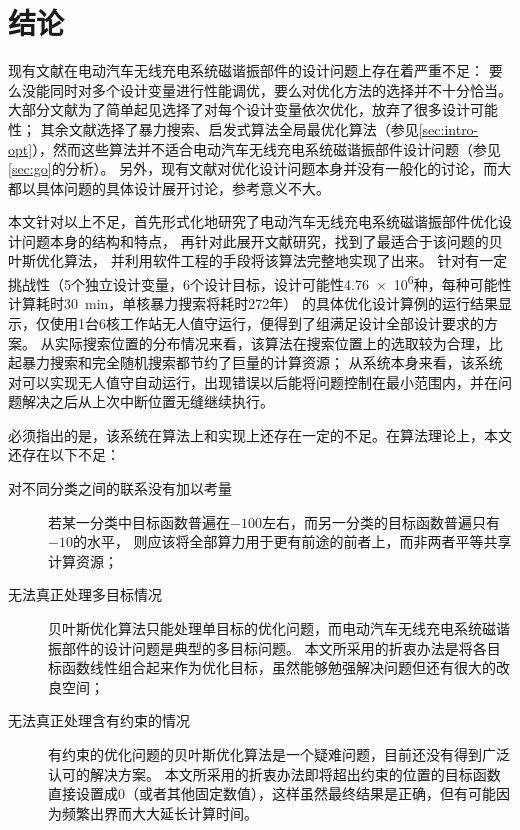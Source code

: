 \documentclass[index]{subfiles}
\begin{document}
\chapter{结论}\label{sec:con}
现有文献在电动汽车无线充电系统磁谐振部件的设计问题上存在着严重不足：
要么没能同时对多个设计变量进行性能调优，要么对优化方法的选择并不十分恰当。
大部分文献为了简单起见选择了对每个设计变量依次优化，放弃了很多设计可能性；
其余文献选择了暴力搜索、启发式算法全局最优化算法（参见\cref{sec:intro-opt}），然而这些算法并不适合电动汽车无线充电系统磁谐振部件设计问题（参见\cref{sec:go}的分析）。
另外，现有文献对优化设计问题本身并没有一般化的讨论，而大都以具体问题的具体设计展开讨论，参考意义不大。

本文针对以上不足，首先形式化地研究了电动汽车无线充电系统磁谐振部件优化设计问题本身的结构和特点，
再针对此展开文献研究，找到了最适合于该问题的贝叶斯优化算法，
并利用软件工程的手段将该算法完整地实现了出来。
针对有一定挑战性（5个独立设计变量，6个设计目标，设计可能性\num{4.76e6}种，每种可能性计算耗时\SI{30}{\minute}，单核暴力搜索将耗时\num{272}年）
的具体优化设计算例的运行结果显示，仅使用1台6核工作站无人值守运行\exmHour{}，便得到了\exmValid{}组满足设计全部设计要求的方案。
从实际搜索位置的分布情况来看，该算法在搜索位置上的选取较为合理，比起暴力搜索和完全随机搜索都节约了巨量的计算资源；
从系统本身来看，该系统对可以实现无人值守自动运行，出现错误以后能将问题控制在最小范围内，并在问题解决之后从上次中断位置无缝继续执行。

必须指出的是，该系统在算法上和实现上还存在一定的不足。在算法理论上，本文还存在以下不足：
\begin{description}
  \item[对不同分类之间的联系没有加以考量] 若某一分类中目标函数普遍在$-100$左右，而另一分类的目标函数普遍只有$-10$的水平，
  则应该将全部算力用于更有前途的前者上，而非两者平等共享计算资源；
  \item[无法真正处理多目标情况] 贝叶斯优化算法只能处理单目标的优化问题，而电动汽车无线充电系统磁谐振部件的设计问题是典型的多目标问题。
  本文所采用的折衷办法是将各目标函数线性组合起来作为优化目标，虽然能够勉强解决问题但还有很大的改良空间；
  \item[无法真正处理含有约束的情况] 有约束的优化问题的贝叶斯优化算法是一个疑难问题，目前还没有得到广泛认可的解决方案。
  本文所采用的折衷办法即将超出约束的位置的目标函数直接设置成0（或者其他固定数值），这样虽然最终结果是正确，但有可能因为频繁出界而大大延长计算时间。
\end{description}
\end{document}
